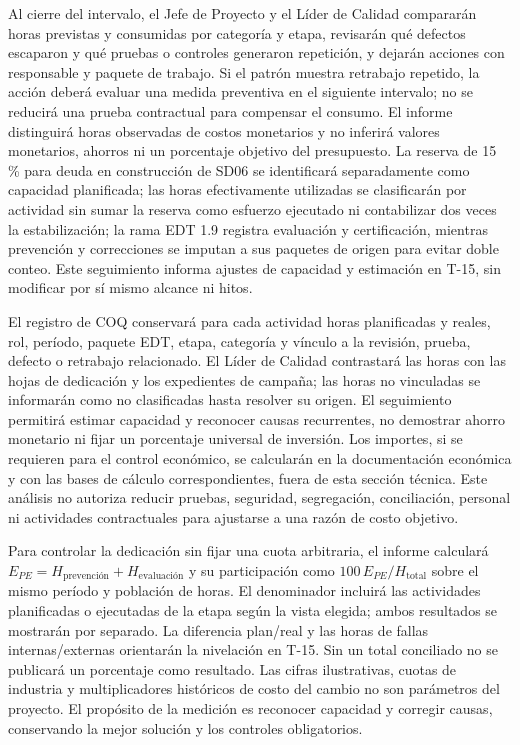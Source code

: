 \documentclass[11pt]{article}
\begin{document}
Al cierre del intervalo, el Jefe de Proyecto y el Líder de Calidad compararán horas previstas y consumidas por categoría y etapa, revisarán qué defectos escaparon y qué pruebas o controles generaron repetición, y dejarán acciones con responsable y paquete de trabajo. Si el patrón muestra retrabajo repetido, la acción deberá evaluar una medida preventiva en el siguiente intervalo; no se reducirá una prueba contractual para compensar el consumo. El informe distinguirá horas observadas de costos monetarios y no inferirá valores monetarios, ahorros ni un porcentaje objetivo del presupuesto. La reserva de 15 \% para deuda en construcción de SD06 se identificará separadamente como capacidad planificada; las horas efectivamente utilizadas se clasificarán por actividad sin sumar la reserva como esfuerzo ejecutado ni contabilizar dos veces la estabilización; la rama EDT 1.9 registra evaluación y certificación, mientras prevención y correcciones se imputan a sus paquetes de origen para evitar doble conteo. Este seguimiento informa ajustes de capacidad y estimación en T-15, sin modificar por sí mismo alcance ni hitos.

El registro de COQ conservará para cada actividad horas planificadas y reales, rol, período, paquete EDT, etapa, categoría y vínculo a la revisión, prueba, defecto o retrabajo relacionado. El Líder de Calidad contrastará las horas con las hojas de dedicación y los expedientes de campaña; las horas no vinculadas se informarán como no clasificadas hasta resolver su origen. El seguimiento permitirá estimar capacidad y reconocer causas recurrentes, no demostrar ahorro monetario ni fijar un porcentaje universal de inversión. Los importes, si se requieren para el control económico, se calcularán en la documentación económica y con las bases de cálculo correspondientes, fuera de esta sección técnica. Este análisis no autoriza reducir pruebas, seguridad, segregación, conciliación, personal ni actividades contractuales para ajustarse a una razón de costo objetivo.

Para controlar la dedicación sin fijar una cuota arbitraria, el informe calculará $E_{PE}=H_{\text{prevención}}+H_{\text{evaluación}}$ y su participación como $100\,E_{PE}/H_{\text{total}}$ sobre el mismo período y población de horas. El denominador incluirá las actividades planificadas o ejecutadas de la etapa según la vista elegida; ambos resultados se mostrarán por separado. La diferencia plan/real y las horas de fallas internas/externas orientarán la nivelación en T-15. Sin un total conciliado no se publicará un porcentaje como resultado. Las cifras ilustrativas, cuotas de industria y multiplicadores históricos de costo del cambio no son parámetros del proyecto. El propósito de la medición es reconocer capacidad y corregir causas, conservando la mejor solución y los controles obligatorios.
\end{document}
